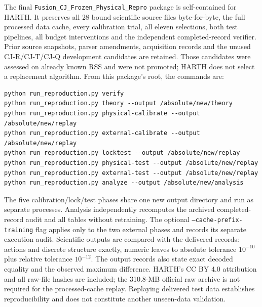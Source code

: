 \documentclass[10pt]{article}
\begin{document}
The final \texttt{Fusion\_CJ\_Frozen\_Physical\_Repro} package is
self-contained for HARTH. It preserves all 28 bound scientific source
files byte-for-byte, the full processed data cache, every calibration trial,
all eleven selections, both test pipelines, all budget interventions and
the independent completed-record verifier. Prior source snapshots, parser
amendments, acquisition records and the unused CJ-R/CJ-T/CJ-Q development
candidates are retained. Those candidates were assessed on already known
RSS and were not promoted; HARTH does not select a replacement algorithm.
From this package's root, the commands are:
\begin{verbatim}
python run_reproduction.py verify
python run_reproduction.py theory --output /absolute/new/theory
python run_reproduction.py physical-calibrate --output /absolute/new/replay
python run_reproduction.py external-calibrate --output /absolute/new/replay
python run_reproduction.py locktest --output /absolute/new/replay
python run_reproduction.py physical-test --output /absolute/new/replay
python run_reproduction.py external-test --output /absolute/new/replay
python run_reproduction.py analyze --output /absolute/new/analysis
\end{verbatim}
The five calibration/lock/test phases share one new output directory and
run as separate processes. Analysis independently recomputes the archived
completed-record audit and all tables without retraining. The optional
\texttt{--cache-prefix-training} flag applies only to the two external
phases and records its separate execution audit. Scientific outputs are
compared with the delivered records: actions and discrete structure exactly,
numeric leaves to absolute tolerance $10^{-10}$ plus relative tolerance
$10^{-12}$. The output records also state exact decoded equality and the
observed maximum difference. HARTH's CC BY 4.0 attribution and all raw-file
hashes are included; the 310.8-MB official raw archive is not required for
the processed-cache replay. Replaying delivered test data establishes
reproducibility and does not constitute another unseen-data validation.
\end{document}
